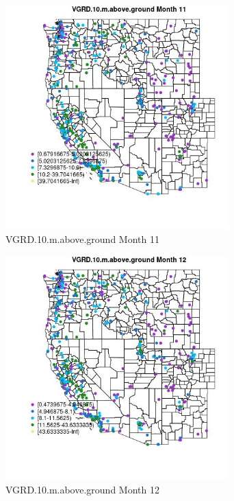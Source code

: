 \begin{figure} 
\centering  
\includegraphics[width=0.77\textwidth]{Code_Outputs/ML_input_report_ML_input_PM25_Step5_part_d_de_duplicated_aves_ML_input_MapObsMo11VGRD10maboveground.jpg} 
\caption{\label{fig:ML_input_report_ML_input_PM25_Step5_part_d_de_duplicated_aves_ML_inputMapObsMo11VGRD10maboveground}VGRD.10.m.above.ground Month 11} 
\end{figure} 
 

\begin{figure} 
\centering  
\includegraphics[width=0.77\textwidth]{Code_Outputs/ML_input_report_ML_input_PM25_Step5_part_d_de_duplicated_aves_ML_input_MapObsMo12VGRD10maboveground.jpg} 
\caption{\label{fig:ML_input_report_ML_input_PM25_Step5_part_d_de_duplicated_aves_ML_inputMapObsMo12VGRD10maboveground}VGRD.10.m.above.ground Month 12} 
\end{figure} 
 

